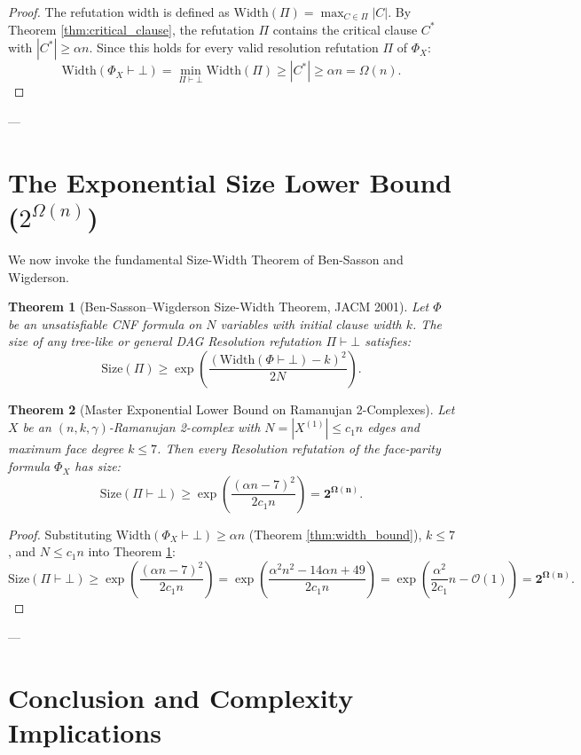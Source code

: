 \documentclass[11pt,a4paper]{article}
\theoremstyle{plain}
\newtheorem{theorem}{Theorem}[section]
\theoremstyle{definition}
\theoremstyle{remark}
\newcommand{\Width}{\mathrm{Width}}
\newcommand{\Size}{\mathrm{Size}}
\begin{document}
\begin{proof}
The refutation width is defined as $\Width(\Pi) = \max_{C \in \Pi} |C|$. By Theorem \ref{thm:critical_clause}, the refutation $\Pi$ contains the critical clause $C^*$ with $|C^*| \ge \alpha n$. Since this holds for every valid resolution refutation $\Pi$ of $\Phi_X$:
\[
\Width(\Phi_X \vdash \bot) = \min_{\Pi \vdash \bot} \Width(\Pi) \ge |C^*| \ge \alpha n = \Omega(n).
\]
\end{proof}

---

\section{The Exponential Size Lower Bound ($2^{\Omega(n)}$)}

We now invoke the fundamental Size-Width Theorem of Ben-Sasson and Wigderson.

\begin{theorem}[Ben-Sasson--Wigderson Size-Width Theorem, JACM 2001]\label{thm:bsw}
Let $\Phi$ be an unsatisfiable CNF formula on $N$ variables with initial clause width $k$. The size of any tree-like or general DAG Resolution refutation $\Pi \vdash \bot$ satisfies:
\[
\Size(\Pi) \ge \exp\left( \frac{(\Width(\Phi \vdash \bot) - k)^2}{2 N} \right).
\]
\end{theorem}

\begin{theorem}[Master Exponential Lower Bound on Ramanujan 2-Complexes]\label{thm:master_exp}
Let $X$ be an $(n, k, \gamma)$-Ramanujan 2-complex with $N = |X^{(1)}| \le c_1 n$ edges and maximum face degree $k \le 7$. 
Then every Resolution refutation of the face-parity formula $\Phi_X$ has size:
\[
\Size(\Pi \vdash \bot) \ge \exp\left( \frac{(\alpha n - 7)^2}{2 c_1 n} \right) = \mathbf{2^{\Omega(n)}}.
\]
\end{theorem}

\begin{proof}
Substituting $\Width(\Phi_X \vdash \bot) \ge \alpha n$ (Theorem \ref{thm:width_bound}), $k \le 7$, and $N \le c_1 n$ into Theorem \ref{thm:bsw}:
\[
\Size(\Pi \vdash \bot) \ge \exp\left( \frac{(\alpha n - 7)^2}{2 c_1 n} \right) = \exp\left( \frac{\alpha^2 n^2 - 14\alpha n + 49}{2 c_1 n} \right) = \exp\left( \frac{\alpha^2}{2 c_1} n - \mathcal{O}(1) \right) = \mathbf{2^{\Omega(n)}}.
\]
\end{proof}

---

\section{Conclusion and Complexity Implications}
\end{document}
